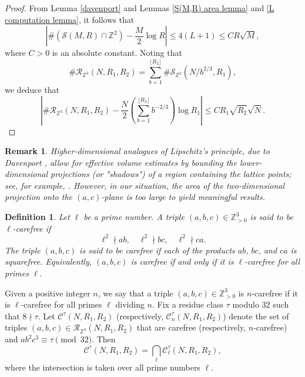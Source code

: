 \documentclass[table]{amsart}
\newtheorem{definition}[theorem]{Definition}
\newtheorem{remark}[theorem]{Remark}
\newcommand{\Z}{\mathbb{Z}}
\numberwithin{equation}{section}
\begin{document}
\begin{proof}
From Lemma \ref{davenport} and Lemmas \ref{S(M,R) area lemma} and \ref{L computation lemma}, it follows that
\[\left|\# \left(\mathcal{S}(M, R)\cap \Z^2\right)-\frac{M}{2}\log R\right|\leq 4(L+1)\leq  C R \sqrt{M},\] where $C>0$ is an absolute constant.
Noting that 
\[\# \mathcal{R}_{\Z^3}(N, R_1, R_2)=\sum_{b=1}^{\lfloor R_2\rfloor} \# \mathcal{S}_{\Z^2}(N/b^{2/3}, R_1),\]
we deduce that 
\[\left|\# \mathcal{R}_{\Z^3}(N, R_1, R_2)-\frac{N}{2}\left(\sum_{b=1}^{\lfloor R_2\rfloor}b^{-2/3}\right) \log R_1 \right|\leq C R_1\sqrt{R_2} \sqrt{N}.\]
\end{proof}
\begin{remark}
Higher-dimensional analogues of Lipschitz’s principle, due to Davenport \cite{Davenportlemma}, allow for effective volume estimates by bounding the lower-dimensional projections (or "shadows") of a region containing the lattice points; see, for example, \cite[Corollary 6.13]{Hol22}. However, in our situation, the area of the two-dimensional projection onto the $(a,c)$-plane is too large to yield meaningful results.
\end{remark}
\begin{definition}\label{carefree definition}
Let $\ell$ be a prime number. A triple $(a,b,c)\in \Z_{>0}^3$ is said to be $\ell$-carefree if
$$
\ell^2 \nmid ab,\quad \ell^2 \nmid bc,\quad \ell^2 \nmid ca.
$$
\noindent The triple $(a,b,c)$ is said to be carefree if each of the products $ab$, $bc$, and $ca$ is squarefree. Equivalently, $(a,b,c)$ is carefree if and only if it is $\ell$-carefree for all primes $\ell$.
\end{definition}
\noindent Given a positive integer $n$, we say that a triple $(a,b,c) \in \Z_{>0}^3$ is $n$-carefree if it is $\ell$-carefree for all primes $\ell$ dividing $n$. Fix a residue class $\tau$ modulo $32$ such that $8\nmid \tau$. Let $\mathcal{C}^\tau(N, R_1, R_2)$ (respectively, $\mathcal{C}_n^\tau(N, R_1, R_2)$) denote the set of triples $(a,b,c) \in \mathcal{R}_{\Z^3}(N, R_1, R_2)$ that are carefree (respectively, $n$-carefree) and $ab^2c^3\equiv \tau\pmod{32}$. Then
$$
\mathcal{C}^\tau(N, R_1, R_2) = \bigcap_{\ell} \mathcal{C}_\ell^\tau(N, R_1, R_2),
$$
\noindent where the intersection is taken over all prime numbers $\ell$.
\end{document}
